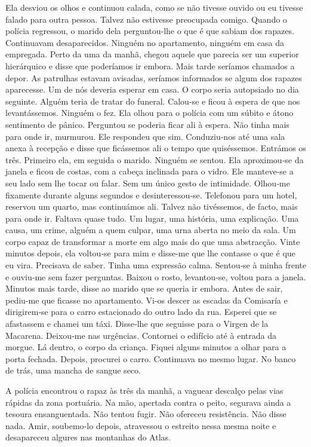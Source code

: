 Ela desviou os olhos e continuou calada, como se não tivesse ouvido ou
eu tivesse falado para outra pessoa. Talvez não estivesse preocupada
comigo. Quando o polícia regressou, o marido dela perguntou­‑lhe o que é
que sabiam dos rapazes. Continuavam desaparecidos. Ninguém no
apartamento, ninguém em casa da empregada. Perto da uma da manhã, chegou
aquele que parecia ser um superior hierárquico e disse que poderíamos ir
embora. Mais tarde seríamos chamados a depor. As patrulhas estavam
avisadas, seríamos informados se algum dos rapazes aparecesse. Um de nós
deveria esperar em casa. O corpo seria autopsiado no dia seguinte.
Alguém teria de tratar do funeral. Calou­‑se e ficou à espera de que nos
levantássemos. Ninguém o fez. Ela olhou para o polícia com um súbito e
átono sentimento de pânico. Perguntou se poderia ficar ali à espera. Não
tinha mais para onde ir, murmurou. Ele respondeu que sim. Conduziu­‑nos
até uma sala anexa à recepção e disse que ficássemos ali o tempo que
quiséssemos. Entrámos os três. Primeiro ela, em seguida o marido.
Ninguém se sentou. Ela aproximou­‑se da janela e ficou de costas, com a
cabeça inclinada para o vidro. Ele manteve­‑se a seu lado sem lhe tocar
ou falar. Sem um único gesto de intimidade. Olhou­‑me fixamente durante
alguns segundos e desinteressou­‑se. Telefonou para um hotel, reservou
um quarto, mas continuámos ali. Talvez não tivéssemos, de facto, mais
para onde ir. Faltava quase tudo. Um lugar, uma história, uma
explicação. Uma causa, um crime, alguém a quem culpar, uma urna aberta
no meio da sala. Um corpo capaz de transformar a morte em algo mais do
que uma abstracção. Vinte minutos depois, ela voltou­‑se para mim e
disse­‑me que lhe contasse o que é que eu vira. Precisava de saber.
Tinha uma expressão calma. Sentou­‑se à minha frente e ouviu­‑me sem
fazer perguntas. Baixou o rosto, levantou­‑se, voltou para a janela.
Minutos mais tarde, disse ao marido que se queria ir embora. Antes de
sair, pediu­‑me que ficasse no apartamento. Vi­‑os descer as escadas da
Comisaría e dirigirem­‑se para o carro estacionado do outro lado da rua.
Esperei que se afastassem e chamei um táxi. Disse­‑lhe que seguisse para
o Virgen de la Macarena. Deixou­‑me nas urgências. Contornei o edifício
até à entrada da morgue. Lá dentro, o corpo da criança. Fiquei alguns
minutos a olhar para a porta fechada. Depois, procurei o carro.
Continuava no mesmo lugar. No banco de trás, uma mancha de sangue seco.

A polícia encontrou o rapaz às três da manhã, a vaguear descalço pelas
vias rápidas da zona portuária. Na mão, apertada contra o peito,
segurava ainda a tesoura ensanguentada. Não tentou fugir. Não ofereceu
resistência. Não disse nada. Amir, soubemo­‑lo depois, atravessou o
estreito nessa mesma noite e desapareceu algures nas montanhas do Atlas.

